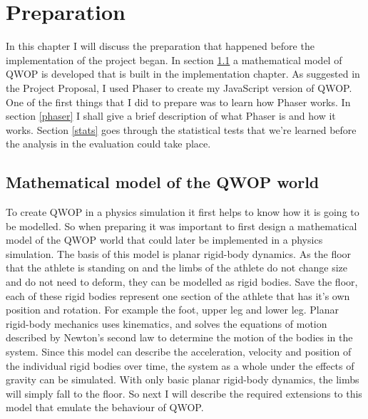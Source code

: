 \documentclass[12pt,a4paper,twoside,openright]{report}
\begin{document}
\chapter{Preparation}

In this chapter I will discuss the preparation that happened before the implementation of the project began.
In section \ref{mathModel} a mathematical model of QWOP is developed that is built in the implementation chapter.
As suggested in the Project Proposal, I used Phaser to create my JavaScript version of QWOP. One of the first things that I did to prepare was to learn how Phaser works. In section \ref{phaser} I shall give a brief description of what Phaser is and how it works.
Section \ref{stats} goes through the statistical tests that we're learned before the analysis in the evaluation could take place.


\section{Mathematical model of the QWOP world}
\label{mathModel}
To create QWOP in a physics simulation it first helps to know how it is going to be modelled. So when preparing it was important to first design a mathematical model of the QWOP world that could later be implemented in a physics simulation.
The basis of this model is planar rigid-body dynamics.
As the floor that the athlete is standing on and the limbs of the athlete do not change size and do not need to deform, they can be modelled as rigid bodies.
Save the floor, each of these rigid bodies represent one section of the athlete that has it's own position and rotation. For example the foot, upper leg and lower leg.
Planar rigid-body mechanics uses kinematics, and solves the equations of motion described by Newton's second law to determine the motion of the bodies in the system.
Since this model can describe the acceleration, velocity and position of the individual rigid bodies over time, the system as a whole under the effects of gravity can be simulated.
With only basic planar rigid-body dynamics, the limbs will simply fall to the floor. So next I will describe the required extensions to this model that emulate the behaviour of QWOP.
\end{document}
